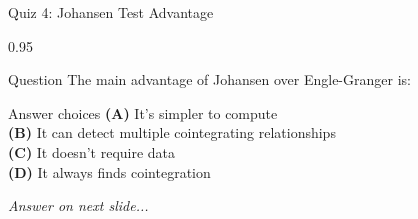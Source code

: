 \documentclass[9pt, aspectratio=169, t]{beamer}
\begin{document}
\begin{frame}{Quiz 4: Johansen Test Advantage}
    \begin{cminipage}{0.95\textwidth}
    \begin{alertblock}{Question}
        The main advantage of Johansen over Engle-Granger is:
    \end{alertblock}

    \vspace{0.4cm}

    \begin{block}{Answer choices}
        \textcolor{MainBlue}{\textbf{(A)}} It's simpler to compute\\[3pt]
        \textcolor{MainBlue}{\textbf{(B)}} It can detect multiple cointegrating relationships\\[3pt]
        \textcolor{MainBlue}{\textbf{(C)}} It doesn't require data\\[3pt]
        \textcolor{MainBlue}{\textbf{(D)}} It always finds cointegration
    \end{block}

    \vspace{0.5cm}

    \begin{center}
        \textit{Answer on next slide...}
    \end{center}
    \end{cminipage}
\end{frame}
\end{document}

